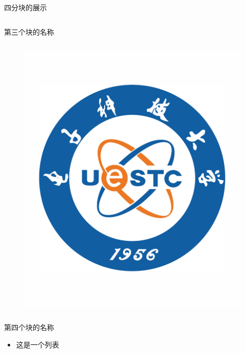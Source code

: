 \documentclass[aspectratio=169]{beamer}
\begin{document}
\begin{frame}{四分块的展示}
\begin{columns}[t]
\begin{column}{0.5\textwidth}
\begin{block}{\scriptsize 第三个块的名称}
\begin{columns}[t]
\begin{column}{0.5\textwidth}
\begin{column}{0.5\textwidth}
\begin{figure}
                                \includegraphics[width=\textwidth]{logo.pdf}
                                \label{fig:figinblock}
                            \end{figure}
                        \end{column}
                    \end{column}
                \end{columns}
            \end{block}	
            \begin{block}{\scriptsize 第四个块的名称}
                \begin{itemize}
                    \item 这是一个列表
                \end{itemize}
                \raggedright 
            \end{block}	
        \end{column}
    \end{columns}
\end{frame}
\end{document}
